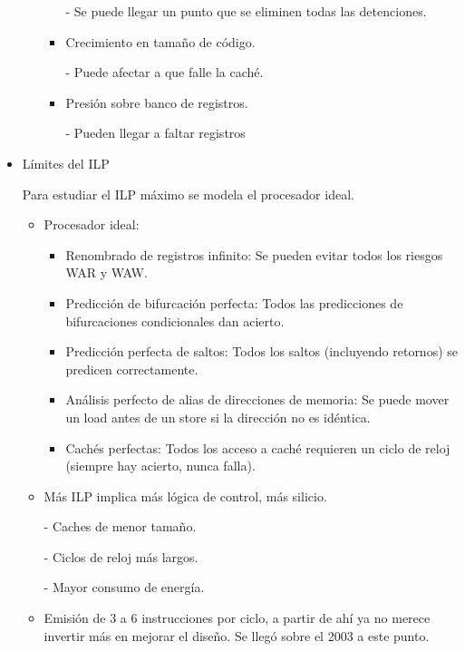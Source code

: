 \documentclass[12pt, twoside, openright]{report} %
\begin{document}
\begin{itemize}
\begin{itemize}
\begin{itemize}
			                  - Se puede llegar un punto que se eliminen todas las detenciones.
			            \item Crecimiento en tamaño de código.

			                  - Puede afectar a que falle la caché.
			            \item Presión sobre banco de registros.

			                  - Pueden llegar a faltar registros
		            \end{itemize}

	      \end{itemize}
	      \pagebreak

	\item Límites del ILP

	      Para estudiar el ILP máximo se modela el procesador
	      ideal.
	      \begin{itemize}
		      \item Procesador ideal:
		            \begin{itemize}
			            \item Renombrado de registros infinito: Se pueden evitar
			                  todos los riesgos WAR y WAW.
			            \item Predicción de bifurcación perfecta: Todos las
			                  predicciones de bifurcaciones condicionales dan acierto.
			            \item Predicción perfecta de saltos: Todos los saltos
			                  (incluyendo retornos) se predicen correctamente.
			            \item Análisis perfecto de alias de direcciones de memoria:
			                  Se puede mover un load antes de un store si la dirección
			                  no es idéntica.
			            \item Cachés perfectas: Todos los acceso a caché requieren un
			                  ciclo de reloj (siempre hay acierto, nunca falla).
		            \end{itemize}
	      \end{itemize}


	      \begin{itemize}
		      \item Más ILP implica más lógica de control, más silicio.

		            - Caches de menor tamaño.

		            - Ciclos de reloj más largos.

		            - Mayor consumo de energía.
		      \item Emisión de 3 a 6 instrucciones por ciclo, a partir de ahí ya no merece invertir más en mejorar el diseño. Se llegó sobre el 2003 a este punto.
	      \end{itemize}
\end{itemize}
\end{document}
